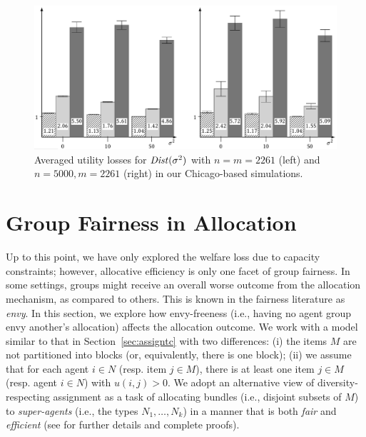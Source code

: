 \documentclass[11pt,dvipdfmx]{article}
\begin{document}
\begin{figure}[t]
	\begin{center}
		\includegraphics[scale=0.21]{figs/chicago.png}
	\end{center}
	\caption{Averaged utility losses for $\operatorname{\mathit{Dist}}(\sigma^2)$ with $n = m = 2261$ (left) and $n = 5000, m = 2261$ (right) in our Chicago-based simulations. \label{figTests4}}
\end{figure}

\section{Group Fairness in Allocation}\label{sec:grfair}
Up to this point, we have only explored the welfare loss due to capacity constraints; however, allocative efficiency is only one facet of group fairness. In some settings, groups might receive an overall worse outcome from the allocation mechanism, as compared to others. This is known in the fairness literature as {\em envy}. In this section, we explore how envy-freeness (i.e., having no agent group envy another's allocation) affects the allocation outcome.
We work with a model similar to that in Section~\ref{sec:assigntc} with two differences: (i) the items $M$ are not partitioned into blocks (or, equivalently, there is one block); (ii) we assume that for each agent $i \in N$ (resp. item $j \in M$), there is at least one item $j \in M$ (resp. agent $i \in N$) with $u(i,j)>0$. 
We adopt an alternative view of diversity-respecting assignment as a task of allocating bundles (i.e., disjoint subsets of $M$) to \emph{super-agents} (i.e., the types $N_1, \ldots, N_k$) in a manner that is both \emph{fair} and \emph{efficient} (see \cite{benabbou2019fairness} for further details and complete proofs). 
\end{document}
